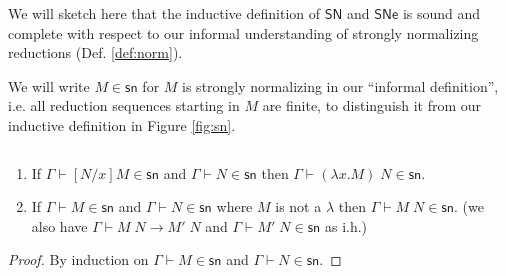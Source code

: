 \documentclass{article}
\newcommand{\SN}{\mathsf{SN}}
\newcommand{\SNe}{\mathsf{SNe}}
\newcommand{\csn}{\mathsf{sn}}
\newcommand{\red}{\longrightarrow}
\begin{document}
We will sketch here that the inductive definition of $\SN$ and $\SNe$ is sound and complete with respect to our informal understanding of strongly normalizing reductions (Def. \ref{def:norm}). 

We will write $M \in \csn$ for $M$ is strongly normalizing in our ``informal definition'', i.e. all reduction sequences starting in $M$ are finite, to distinguish it from our inductive definition in Figure \ref{fig:sn}. 

\begin{lemma}\label{lem:psn}$\;$
  \begin{enumerate}
  \item\label{pp1} If $\Gamma \vdash   [N/x]M \in \csn$
                  and $\Gamma \vdash N \in \csn$ 
                 then $\Gamma \vdash (\lambda x.M) \;N \in \csn$.
  \item\label{pp2} If $\Gamma \vdash M \in \csn$
                  and $\Gamma \vdash N \in \csn$ where $M$ is not a $\lambda$
                 then $\Gamma \vdash M\;N \in \csn$. (we also have $\Gamma
                 \vdash M\;N \red M'\;N$ and $\Gamma \vdash M'\;N \in \csn$ as i.h.)
  \end{enumerate} 
\end{lemma}
\begin{proof}
By induction on $\Gamma \vdash M \in \csn$ and $\Gamma \vdash N \in \csn$.  
\end{proof}
\end{document}
